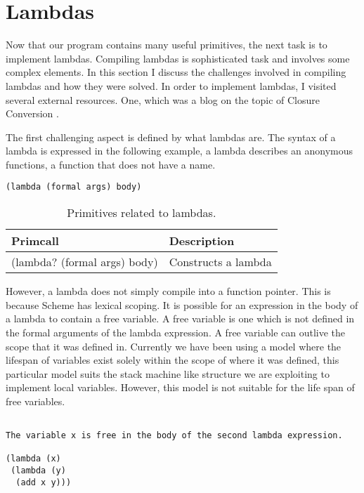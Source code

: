 \documentclass{article}
\begin{document}
\section{Lambdas}

Now that our program contains many useful primitives, the next task is to implement lambdas. Compiling lambdas is sophisticated task and involves some complex elements. In this section I discuss the challenges involved in compiling lambdas and how they were solved. In order to implement lambdas, I visited several external resources. One, which was a blog on the topic of Closure Conversion \cite{closure-conversion}.

The first challenging aspect is defined by what lambdas are. The syntax of a lambda is expressed in the following example, a lambda describes an anonymous functions, a function that does not have a name. 

\begin{verbatim}
(lambda (formal args) body)
\end{verbatim}

\begin{table}[ht]
  \centering
\begin{tabular}{ l l }
  \toprule
  Primcall & Description \\ \hline
  \midrule
  (lambda? (formal args) body) & Constructs a lambda \\
  \bottomrule
\end{tabular}
\caption{Primitives related to lambdas.} \label{tab:lambdas}
\end{table}

However, a lambda does not simply compile into a function pointer. This is because Scheme has lexical scoping. It is possible for an expression in the body of a lambda to contain a free variable. A free variable is one which is not defined in the formal arguments of the lambda expression. A free variable can outlive the scope that it was defined in. Currently we have been using a model where the lifespan of variables exist solely within the scope of where it was defined, this particular model suits the stack machine like structure we are exploiting to implement local variables. However, this model is not suitable for the life span of free variables.

\begin{verbatim}

The variable x is free in the body of the second lambda expression. 

(lambda (x) 
 (lambda (y) 
  (add x y)))

\end{verbatim}
\end{document}
